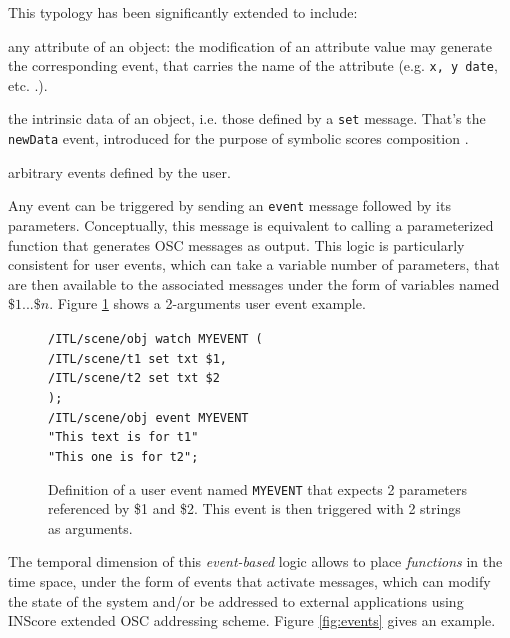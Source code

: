 \documentclass{article}
\newcommand{\OSC}[1]	{{\fontsize{8.5pt}{8pt} \selectfont\texttt{#1}}}
\newcommand{\tab}{\hspace*{4mm}}
\let\olditemize\itemize
\let\oldenditemize\enditemize
\renewenvironment{itemize} 	{\olditemize \renewcommand{\labelitemi}{$\bullet$} \setlength{\itemsep}{0mm}}{\oldenditemize}
\newcommand{\sample}[1]		{\vspace{-0.2em}\begin{center}\colorbox{mygrey}{\begin{minipage}[t]{0.98\columnwidth} {\small \texttt{#1}}\end{minipage}}\end{center}}
\begin{document}
This typology has been significantly extended to include:
\begin{itemize}
\item any attribute of an object: the modification of an attribute value may generate the corresponding event, that carries the name of the attribute (e.g. \OSC{x, y date}, etc. .).
\item the intrinsic data of an object, i.e. those defined by a \OSC{set} message. That's the \OSC{newData} event, introduced for the purpose of symbolic scores composition \cite{Lepetit-Aimon_tenor2016}.
\item arbitrary events defined by the user.
\end{itemize}

Any event can be triggered by sending an \OSC{event} message followed by its parameters. Conceptually, this message  is equivalent to calling a parameterized function that generates OSC messages as output.
This logic is particularly consistent for user events, which can take a variable number of parameters, that are then available to the associated messages under the form of variables named $\$1 ... \$n$. Figure \ref{fig:uevent} shows a 2-arguments user event example.

\begin{figure}[h]
   \centering
   \sample{/ITL/scene/obj watch MYEVENT ( \\
\tab/ITL/scene/t1 set txt \$1, \\
\tab/ITL/scene/t2 set txt \$2 \\
);   \\   
/ITL/scene/obj event MYEVENT \\
\hspace*{25mm}"This text is for t1"\\
\hspace*{25mm}"This one is for t2"; 
}
   \caption{Definition of a user event named \OSC{MYEVENT} that expects 2 parameters referenced by \$1 and \$2. This event is then triggered with 2 strings as arguments.}
   \label{fig:uevent}
\end{figure}

The temporal dimension of this \emph{event-based} logic allows to place \emph{functions} in the time space, under the form of events that activate messages, which can modify the state of the system and/or be addressed to external applications using INScore extended OSC addressing scheme. Figure \ref{fig:events} gives an example.
  
\end{document}
